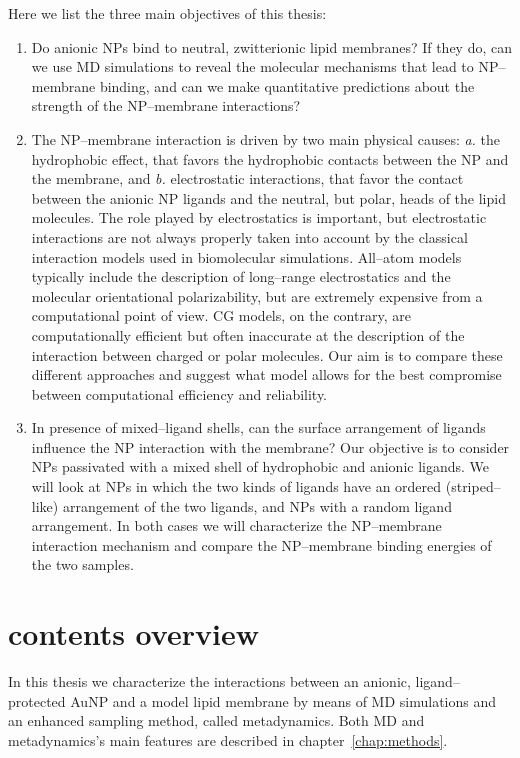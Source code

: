 Here we list the three main objectives of this thesis:
\begin{enumerate}[label=\itshape\roman*.]
	\item Do anionic \acp{NP} bind to neutral, zwitterionic lipid membranes? If they do, can we use \ac{MD} simulations to reveal the molecular mechanisms that lead to \ac{NP}--membrane binding, and can we make quantitative predictions about the strength of the \ac{NP}--membrane interactions?%
	\item The \ac{NP}--membrane interaction is driven by two main physical causes: \textit{a.} the hydrophobic effect, that favors the hydrophobic contacts between the \ac{NP} and the membrane, and \textit{b.} electrostatic interactions, that favor the contact between the anionic \ac{NP} ligands and the neutral, but polar, heads of the lipid molecules. The role played by electrostatics is important, but electrostatic interactions are not always properly taken into account by the classical interaction models used in biomolecular simulations. All--atom models typically include the description of long--range electrostatics and the molecular orientational polarizability, but are extremely expensive from a computational point of view. \ac{CG} models, on the contrary, are computationally efficient but often inaccurate at the description of the interaction between charged or polar molecules. Our aim is to compare these different approaches and suggest what model allows for the best compromise between computational efficiency and reliability.%
	\item In presence of mixed--ligand shells, can the surface arrangement of ligands influence the \ac{NP} interaction with the membrane? Our objective is to consider \acp{NP} passivated with a mixed shell of hydrophobic and anionic ligands. We will look at \acp{NP} in which the two kinds of ligands have an ordered (striped--like) arrangement of the two ligands, and \acp{NP} with a random ligand arrangement. In both cases we will characterize the \ac{NP}--membrane interaction mechanism and compare the \ac{NP}--membrane binding energies of the two samples.%
\end{enumerate}

\section{contents overview}
In this thesis we characterize the interactions between an anionic, ligand--protected \ac{AuNP} and a model lipid membrane by means of \ac{MD} simulations and an enhanced sampling method, called metadynamics. Both \ac{MD} and metadynamics's main features are described in chapter~\ref{chap:methods}.


